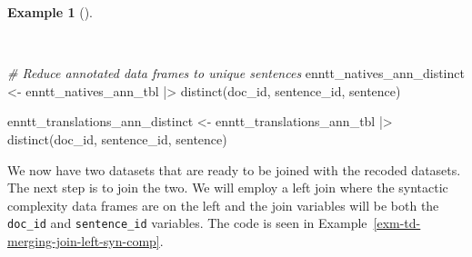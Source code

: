 \documentclass[
  letterpaper,
  DIV=11,
  numbers=noendperiod]{scrreprt}
\newenvironment{Shaded}{\begin{snugshade}}{\end{snugshade}}
\newcommand{\CommentTok}[1]{\textcolor[rgb]{0.00,0.00,0.00}{\textit{#1}}}
\newcommand{\FunctionTok}[1]{\textcolor[rgb]{0.00,0.00,0.00}{#1}}
\newcommand{\NormalTok}[1]{\textcolor[rgb]{0.00,0.00,0.00}{#1}}
\newcommand{\OtherTok}[1]{\textcolor[rgb]{0.00,0.00,0.00}{#1}}
\newcommand{\SpecialCharTok}[1]{\textcolor[rgb]{0.00,0.00,0.00}{#1}}
\theoremstyle{definition}
\newtheorem{example}{Example}[chapter]
\theoremstyle{remark}
\begin{document}
\begin{example}[]\protect\hypertarget{exm-td-merging-annotation-distinct}{}\label{exm-td-merging-annotation-distinct}

~

\begin{Shaded}
\begin{Highlighting}[]
\CommentTok{\# Reduce annotated data frames to unique sentences}
\NormalTok{enntt\_natives\_ann\_distinct }\OtherTok{\textless{}{-}}
\NormalTok{  enntt\_natives\_ann\_tbl }\SpecialCharTok{|\textgreater{}}
  \FunctionTok{distinct}\NormalTok{(doc\_id, sentence\_id, sentence)}

\NormalTok{enntt\_translations\_ann\_distinct }\OtherTok{\textless{}{-}}
\NormalTok{  enntt\_translations\_ann\_tbl }\SpecialCharTok{|\textgreater{}}
  \FunctionTok{distinct}\NormalTok{(doc\_id, sentence\_id, sentence)}
\end{Highlighting}
\end{Shaded}

\end{example}

We now have two datasets that are ready to be joined with the recoded
datasets. The next step is to join the two. We will employ a left join
where the syntactic complexity data frames are on the left and the join
variables will be both the \texttt{doc\_id} and \texttt{sentence\_id}
variables. The code is seen in
Example~\ref{exm-td-merging-join-left-syn-comp}.
\end{document}
